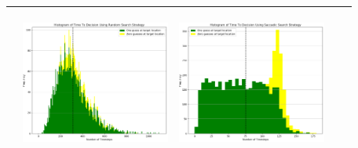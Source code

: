 \begin{landscape}
\begin{table}[h!]
\begin{tabular}{ | c | c | c | c | c |}
\begin{minipage}[c][52mm][c]{49mm}
    \end{minipage}
    &
    \begin{minipage}[c][52mm][c]{49mm}
      \includegraphics[width=49mm, height=49mm]{Chapters/MultiAgentTargetDetection/Figs/Histograms/MultipleAgent/2/SingleAgentSingleSource2RandomHistogram.png}
    \end{minipage}
    &
    \begin{minipage}[c][52mm][c]{49mm}
      \includegraphics[width=49mm, height=49mm]{Chapters/MultiAgentTargetDetection/Figs/Histograms/MultipleAgent/2/SingleAgentSingleSource2SaccadicHistogram.png}
    \end{minipage}
    \\
    \hline


\end{tabular}
\end{table}
\end{landscape}
